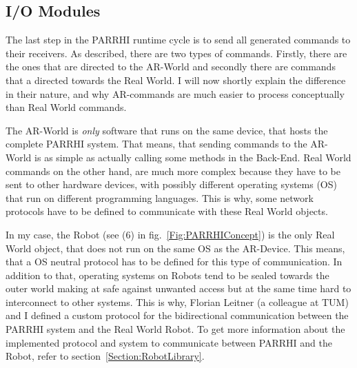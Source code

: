 \subsection{I/O Modules}

The last step in the PARRHI runtime cycle is to send all generated commands to their receivers. As described, there are two types of commands. Firstly, there are the ones that are directed to the AR-World and secondly there are commands that a directed towards the Real World. I will now shortly explain the difference in their nature, and why AR-commands are much easier to process conceptually than Real World commands.

The AR-World is \textit{only} software that runs on the same device, that hosts the complete PARRHI system. That means, that sending commands to the AR-World is as simple as actually calling some methods in the Back-End. Real World commands on the other hand, are much more complex because they have to be sent to other hardware devices, with possibly different operating systems (OS) that run on different programming languages. This is why, some network protocols have to be defined to communicate with these Real World objects. 

In my case, the Robot (see (6) in fig.~\ref{Fig:PARRHIConcept}) is the only Real World object, that does not run on the same OS as the AR-Device. This means, that a OS neutral protocol has to be defined for this type of communication. In addition to that, operating systems on Robots tend to be sealed towards the outer world making at safe against unwanted access but at the same time hard to interconnect to other systems. This is why, Florian Leitner (a colleague at TUM) and I defined a custom protocol for the bidirectional communication between the PARRHI system and the Real World Robot. To get more information about the implemented protocol and system to communicate between PARRHI and the Robot, refer to section~\ref{Section:RobotLibrary}.


























